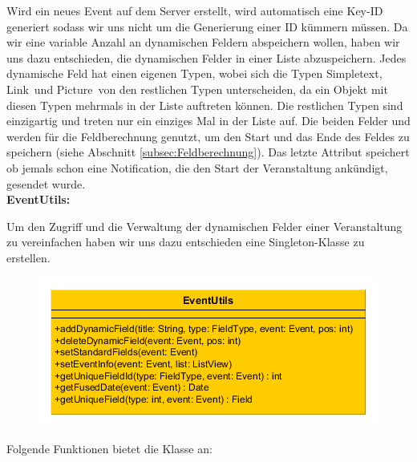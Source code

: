 Wird ein neues Event auf dem Server erstellt, wird automatisch eine Key-ID generiert sodass wir uns nicht um die Generierung einer ID kümmern müssen. Da wir eine variable Anzahl an dynamischen Feldern abspeichern wollen, haben wir uns dazu entschieden, die dynamischen Felder in einer Liste abzuspeichern. Jedes dynamische Feld hat einen eigenen Typen, wobei sich die Typen \glqq Simpletext\grqq, \glqq Link\grqq\ und \glqq Picture\grqq\ von den restlichen Typen unterscheiden, da ein Objekt mit diesen Typen mehrmals in der Liste auftreten können. Die restlichen Typen sind einzigartig und treten nur ein einziges Mal in der Liste auf. Die beiden Felder  und  werden für die Feldberechnung genutzt, um den Start und  das Ende des Feldes zu speichern
(siehe Abschnitt \ref{subsec:Feldberechnung}). Das letzte Attribut  speichert ob jemals schon eine Notification, die den Start der Veranstaltung ankündigt, gesendet wurde.\\

\textbf{EventUtils:}

Um den Zugriff und die Verwaltung der dynamischen Felder einer Veranstaltung zu vereinfachen haben wir uns dazu entschieden eine Singleton-Klasse  zu erstellen.

\begin{figure}[htb]
\centering
\includegraphics[width=.75\textwidth]{graphics/EventUtils_long.png}
\label{fig:eventutils}
\end{figure}

Folgende Funktionen bietet die Klasse  an:

